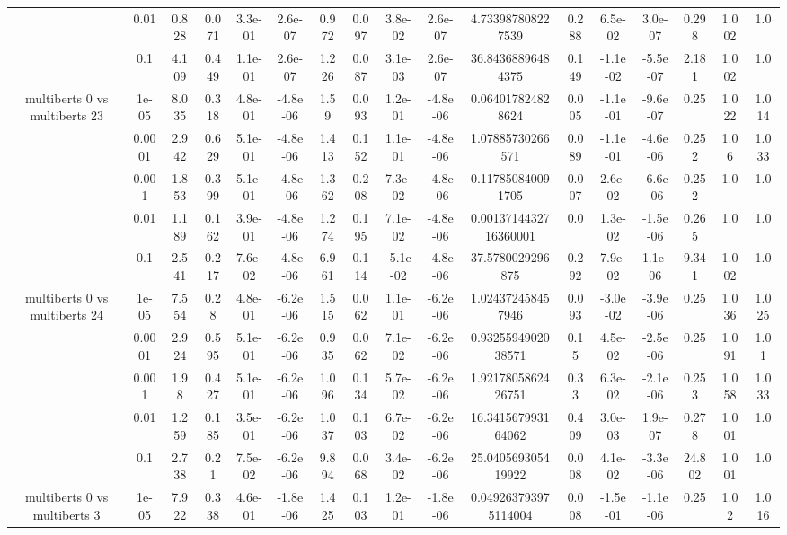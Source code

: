 \begin{tabular}{|c|c|c|c|c|c|c|c|c|c|c|c|c|c|c|c|c|}
 & 0.01 & 0.828 & 0.071 & 3.3e-01 & 2.6e-07 & 0.972 & 0.097 & 3.8e-02 & 2.6e-07 & 4.733987808227539 & 0.288 & 6.5e-02 & 3.0e-07 & 0.298 & 1.002 & 1.0 \\
 & 0.1 & 4.109 & 0.449 & 1.1e-01 & 2.6e-07 & 1.226 & 0.087 & 3.1e-03 & 2.6e-07 & 36.84368896484375 & 0.149 & -1.1e-02 & -5.5e-07 & 2.181 & 1.002 & 1.0 \\
\hline
\multirow{5}{*}{multiberts 0 vs multiberts 23} & 1e-05 & 8.035 & 0.318 & 4.8e-01 & -4.8e-06 & 1.59 & 0.093 & 1.2e-01 & -4.8e-06 & 0.064017824828624 & 0.005 & -1.1e-01 & -9.6e-07 & 0.25 & 1.022 & 1.014 \\
 & 0.0001 & 2.942 & 0.629 & 5.1e-01 & -4.8e-06 & 1.413 & 0.152 & 1.1e-01 & -4.8e-06 & 1.07885730266571 & 0.089 & -1.1e-01 & -4.6e-06 & 0.252 & 1.06 & 1.033 \\
 & 0.001 & 1.853 & 0.399 & 5.1e-01 & -4.8e-06 & 1.362 & 0.208 & 7.3e-02 & -4.8e-06 & 0.117850840091705 & 0.007 & 2.6e-02 & -6.6e-06 & 0.252 & 1.0 & 1.0 \\
 & 0.01 & 1.189 & 0.162 & 3.9e-01 & -4.8e-06 & 1.274 & 0.195 & 7.1e-02 & -4.8e-06 & 0.0013714432716360001 & 0.0 & 1.3e-02 & -1.5e-06 & 0.265 & 1.0 & 1.0 \\
 & 0.1 & 2.541 & 0.217 & 7.6e-02 & -4.8e-06 & 6.961 & 0.114 & -5.1e-02 & -4.8e-06 & 37.5780029296875 & 0.292 & 7.9e-02 & 1.1e-06 & 9.341 & 1.002 & 1.0 \\
\hline
\multirow{5}{*}{multiberts 0 vs multiberts 24} & 1e-05 & 7.554 & 0.28 & 4.8e-01 & -6.2e-06 & 1.515 & 0.062 & 1.1e-01 & -6.2e-06 & 1.024372458457946 & 0.093 & -3.0e-02 & -3.9e-06 & 0.25 & 1.036 & 1.025 \\
 & 0.0001 & 2.924 & 0.595 & 5.1e-01 & -6.2e-06 & 0.935 & 0.062 & 7.1e-02 & -6.2e-06 & 0.9325594902038571 & 0.15 & 4.5e-02 & -2.5e-06 & 0.25 & 1.091 & 1.01 \\
 & 0.001 & 1.98 & 0.427 & 5.1e-01 & -6.2e-06 & 1.096 & 0.134 & 5.7e-02 & -6.2e-06 & 1.9217805862426751 & 0.33 & 6.3e-02 & -2.1e-06 & 0.253 & 1.058 & 1.033 \\
 & 0.01 & 1.259 & 0.185 & 3.5e-01 & -6.2e-06 & 1.037 & 0.103 & 6.7e-02 & -6.2e-06 & 16.341567993164062 & 0.409 & 3.0e-03 & 1.9e-07 & 0.278 & 1.001 & 1.0 \\
 & 0.1 & 2.738 & 0.21 & 7.5e-02 & -6.2e-06 & 9.894 & 0.068 & 3.4e-02 & -6.2e-06 & 25.040569305419922 & 0.008 & 4.1e-02 & -3.3e-06 & 24.802 & 1.001 & 1.0 \\
\hline
\multirow{5}{*}{multiberts 0 vs multiberts 3} & 1e-05 & 7.922 & 0.338 & 4.6e-01 & -1.8e-06 & 1.425 & 0.103 & 1.2e-01 & -1.8e-06 & 0.049263793975114004 & 0.008 & -1.5e-01 & -1.1e-06 & 0.25 & 1.02 & 1.016 \\

\end{tabular}
